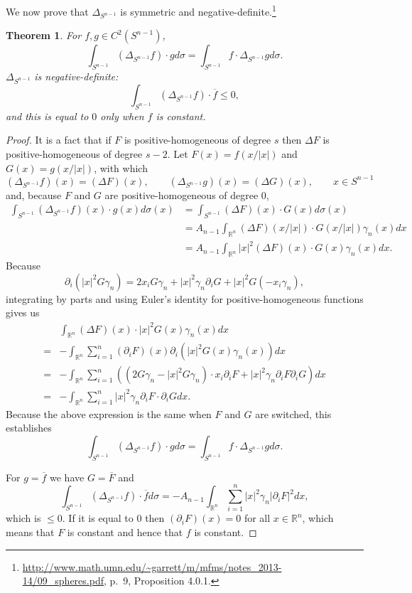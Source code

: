 \documentclass{article}
\newtheorem{theorem}{Theorem}
\theoremstyle{definition}
\begin{document}
We now prove that $\Delta_{S^{n-1}}$ is symmetric and negative-definite.\footnote{\url{http://www.math.umn.edu/~garrett/m/mfms/notes_2013-14/09_spheres.pdf},
p.~9, Proposition 4.0.1.}

\begin{theorem}
For $f,g \in C^2(S^{n-1})$,
\[
\int_{S^{n-1}} (\Delta_{S^{n-1}} f) \cdot g d\sigma
=\int_{S^{n-1}} f \cdot \Delta_{S^{n-1}} g d\sigma.
\]
$\Delta_{S^{n-1}}$ is negative-definite:
\[
\int_{S^{n-1}} (\Delta_{S^{n-1}} f) \cdot \overline{f} \leq 0,
\]
and this is equal to $0$ only when $f$ is constant.
\end{theorem}
\begin{proof}
It is a fact that if $F$ is positive-homogeneous of degree $s$ then $\Delta F$ is positive-homogeneous of degree $s-2$. 
Let $F(x)=f(x/|x|)$ and $G(x)=g(x/|x|)$, with which
\[
(\Delta_{S^{n-1}} f)(x) = (\Delta F)(x),\qquad
(\Delta_{S^{n-1}} g)(x) = (\Delta G)(x),\qquad x \in S^{n-1}
\]
and, because $F$ and $G$ are positive-homogeneous of degree $0$,
\begin{align*}
\int_{S^{n-1}} (\Delta_{S^{n-1}} f)(x) \cdot g(x)d\sigma(x)&=\int_{S^{n-1}} (\Delta F)(x) \cdot G(x) d\sigma(x)\\
&=A_{n-1} \int_{\mathbb{R}^n} 
(\Delta F)(x/|x|) \cdot G(x/|x|) \gamma_n(x) dx\\
&=A_{n-1} \int_{\mathbb{R}^n} |x|^2 (\Delta F)(x) \cdot G(x) \gamma_n(x) dx.
\end{align*}
Because
\[
\partial_i(|x|^2 G \gamma_n) 
=2x_i G\gamma_n + |x|^2 \gamma_n \partial_i G +|x|^2 G (-x_i \gamma_n),
\]
integrating by parts and using 
Euler's identity for positive-homogeneous functions gives us
\[
\begin{split}
&\int_{\mathbb{R}^n}(\Delta F)(x) \cdot  |x|^2 G(x) \gamma_n(x) dx\\
=&-\int_{\mathbb{R}^n} \sum_{i=1}^n (\partial_i F)(x) \partial_i( |x|^2 G(x) \gamma_n(x)) dx\\
=&-\int_{\mathbb{R}^n} \sum_{i=1}^n ((2G\gamma_n-|x|^2 G\gamma_n) \cdot x_i \partial_i F
+|x|^2 \gamma_n \partial_i F \partial_i G) dx\\
=&-\int_{\mathbb{R}^n} \sum_{i=1}^n |x|^2 \gamma_n \partial_i F \cdot \partial_i G dx.
\end{split}
\]
Because the above expression is the same when $F$ and $G$ are switched, this establishes 
\[
\int_{S^{n-1}} (\Delta_{S^{n-1}} f) \cdot g d\sigma
=\int_{S^{n-1}} f \cdot \Delta_{S^{n-1}} g d\sigma.
\]

For $g = \overline{f}$ we have $G=\overline{F}$ and 
\[
\int_{S^{n-1}} (\Delta_{S^{n-1}} f) \cdot \overline{f} d\sigma
=-A_{n-1} \int_{\mathbb{R}^n} \sum_{i=1}^n |x|^2 \gamma_n |\partial_i F|^2 dx,
\]
which is $\leq 0$. If it is equal to $0$ then $(\partial_i F)(x)=0$ for all $x \in \mathbb{R}^n$, 
which means that $F$ is constant and hence that $f$ is constant.
\end{proof}
\end{document}
